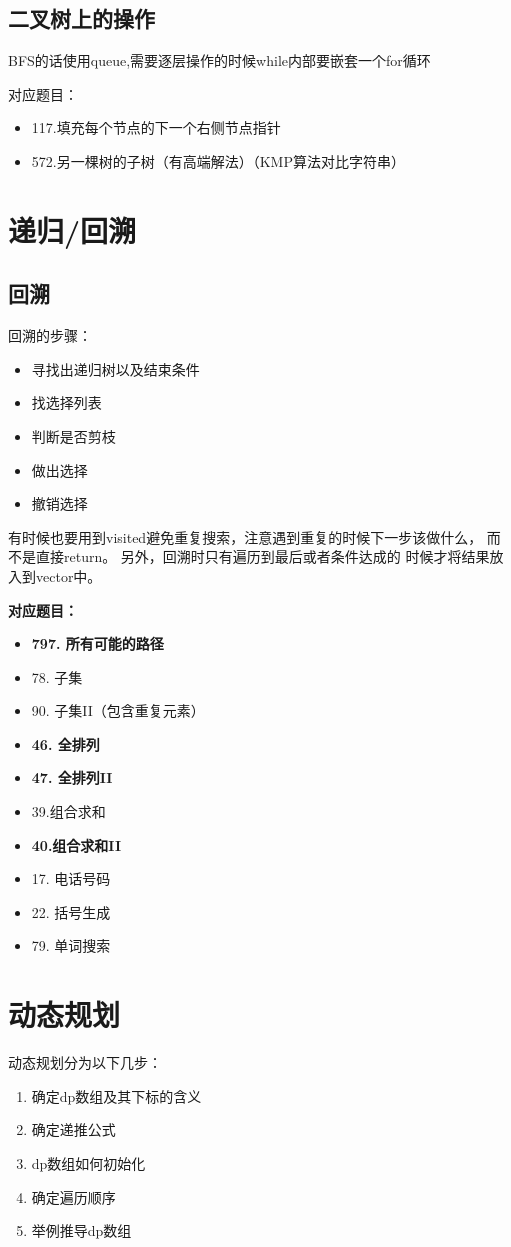\documentclass[a4paper,twoside]{ctexart}
\begin{document}
\subsection{二叉树上的操作}

BFS的话使用queue,需要逐层操作的时候while内部要嵌套一个for循环

对应题目：
\begin{itemize}
\item 117.填充每个节点的下一个右侧节点指针
\item 572.另一棵树的子树（有高端解法）（KMP算法对比字符串）
\end{itemize}

\section{递归/回溯}

\subsection{回溯}

回溯的步骤：
\begin{itemize}
\item 寻找出递归树以及结束条件
\item 找选择列表
\item 判断是否剪枝
\item 做出选择
\item 撤销选择
\end{itemize}

有时候也要用到visited避免重复搜索，注意遇到重复的时候下一步该做什么，
而不是直接return。 另外，回溯时只有遍历到最后或者条件达成的
时候才将结果放入到vector中。

\textbf{对应题目：}
\begin{itemize}
\item \textbf{797. 所有可能的路径}
\item 78. 子集
\item 90. 子集II（包含重复元素）
\item \textbf{46. 全排列}
\item \textbf{47. 全排列II}
\item 39.组合求和
\item \textbf{40.组合求和II}
\item 17. 电话号码
\item 22. 括号生成
\item 79. 单词搜索
\end{itemize}


\section{动态规划}

动态规划分为以下几步：
\begin{enumerate}
\item 确定dp数组及其下标的含义
\item 确定递推公式
\item dp数组如何初始化
\item 确定遍历顺序
\item 举例推导dp数组
\end{enumerate}
\end{document}
